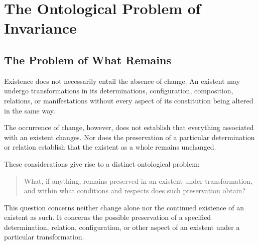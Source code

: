 %
%
%
%

\section{The Ontological Problem of Invariance}
\label{sec:ontological-problem-of-invariance}

\subsection{The Problem of What Remains}

Existence does not necessarily entail the absence of change.
An existent may undergo transformations in its determinations,
configuration, composition, relations, or manifestations without
every aspect of its constitution being altered in the same way.

The occurrence of change, however, does not establish that
everything associated with an existent changes. Nor does the
preservation of a particular determination or relation establish
that the existent as a whole remains unchanged.

These considerations give rise to a distinct ontological problem:

\begin{quote}
What, if anything, remains preserved in an existent under
transformation, and within what conditions and respects does
such preservation obtain?
\end{quote}

This question concerns neither change alone nor the continued
existence of an existent as such. It concerns the possible
preservation of a specified determination, relation, configuration,
or other aspect of an existent under a particular transformation.

